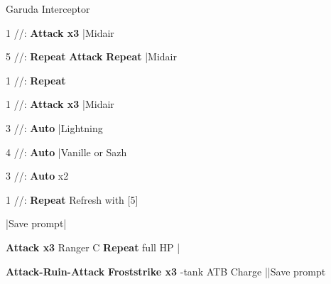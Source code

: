 \begin{fight}{Garuda Interceptor}
	\item [1] \com/\rav/\rav: \textbf{Attack x3} |Midair
	\item [5] \com/\rav/\rav: \textbf{Repeat} \to \textbf{Attack} \to \textbf{Repeat} |Midair
	\item [1] \com/\rav/\rav: \textbf{Repeat}
	\item {}
	\item [1] \com/\rav/\rav: \textbf{Attack x3} |Midair
	\item [3] \rav/\rav/\rav: \textbf{Auto} |Lightning
	\item [4] \rav/\rav/\rav: \textbf{Auto} |Vanille or Sazh
	\item [3] \rav/\rav/\rav: \textbf{Auto} x2
	\item [1] \com/\rav/\rav: \textbf{Repeat} \to Refresh with [5]
	\item \skip|Save prompt|\skip
\end{fight}
\begin{mainlist}
	\item {} \textbf{Attack x3} Ranger C \to
		\textbf{Repeat} full HP |\skip
	\item {} \textbf{Attack-Ruin-Attack} \to
		\textbf{Froststrike x3} \to \sen-tank ATB Charge ||Save prompt
\end{mainlist}
